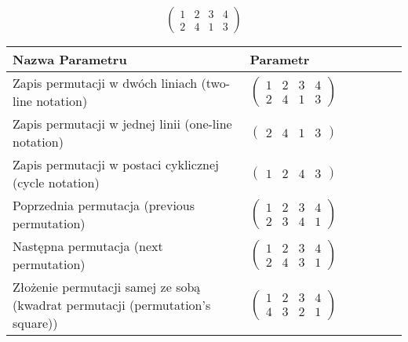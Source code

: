 \documentclass[12pt]{article}
\begin{document}
\subsection{}
\begin{center}
\[
\begin{pmatrix}
	1 & 2 & 3 & 4 \\ 
	2 & 4 & 1 & 3 
\end{pmatrix}
\]

\begin{tabular}{|m{0.6\linewidth}|m{0.4\linewidth}|}
	\hline
	Nazwa Parametru & Parametr \\
	\hline
	Zapis permutacji w dwóch liniach (two-line notation) & $\begin{pmatrix} 1 & 2 & 3 & 4 \\ 
2 & 4 & 1 & 3 \end{pmatrix}$ \\ 
	\hline
	Zapis permutacji w jednej linii (one-line notation) & $\begin{pmatrix} 2 & 4 & 1 & 3 \end{pmatrix}$ \\ 
	\hline
	Zapis permutacji w postaci cyklicznej (cycle notation) & $\begin{pmatrix} 1 & 2 & 4 & 3 \end{pmatrix} $ \\ 
	\hline
	Poprzednia permutacja (previous permutation) & $\begin{pmatrix} 1 & 2 & 3 & 4 \\ 
2 & 3 & 4 & 1 \end{pmatrix}$ \\ 
	\hline
	Następna permutacja (next permutation) & $\begin{pmatrix} 1 & 2 & 3 & 4 \\ 
2 & 4 & 3 & 1 \end{pmatrix}$ \\ 
	\hline
	Złożenie permutacji samej ze sobą (kwadrat permutacji (permutation's square)) & $\begin{pmatrix} 1 & 2 & 3 & 4 \\ 
4 & 3 & 2 & 1 \end{pmatrix}$ \\ 
	\hline
\end{tabular}
\end{center}
\end{document}
